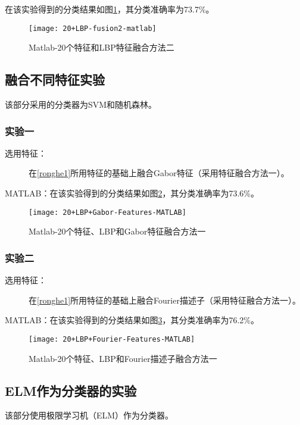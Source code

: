 在该实验得到的分类结果如图\ref{fig:20+LBP-fusion2-matlab}，其分类准确率为73.7\%。
\begin{figure}[!ht]
\centering
\texttt{[image: 20+LBP-fusion2-matlab]}
\caption{Matlab-20个特征和LBP特征融合方法二}
\label{fig:20+LBP-fusion2-matlab}
\end{figure}

\subsection{融合不同特征实验}
该部分采用的分类器为SVM和随机森林。
\subsubsection{实验一}
\begin{description}
\item[选用特征：] 在\ref{ronghe1}所用特征的基础上融合Gabor特征（采用特征融合方法一）。
\end{description}
MATLAB：在该实验得到的分类结果如图\ref{fig:20+LBP+Gabor-Features-MATLAB}，其分类准确率为73.6\%。
\begin{figure}[!ht]
\centering
\texttt{[image: 20+LBP+Gabor-Features-MATLAB]}
\caption{Matlab-20个特征、LBP和Gabor特征融合方法一}
\label{fig:20+LBP+Gabor-Features-MATLAB}
\end{figure}

\subsubsection{实验二}
\begin{description}
\item[选用特征：] 在\ref{ronghe1}所用特征的基础上融合Fourier描述子（采用特征融合方法一）。
\end{description}
MATLAB：在该实验得到的分类结果如图\ref{fig:20+LBP+Fourier-Features-MATLAB}，其分类准确率为76.2\%。
\begin{figure}[!ht]
\centering
\texttt{[image: 20+LBP+Fourier-Features-MATLAB]}
\caption{Matlab-20个特征、LBP和Fourier描述子融合方法一}
\label{fig:20+LBP+Fourier-Features-MATLAB}
\end{figure}

\subsection{ELM作为分类器的实验}
该部分使用极限学习机（ELM）作为分类器。

